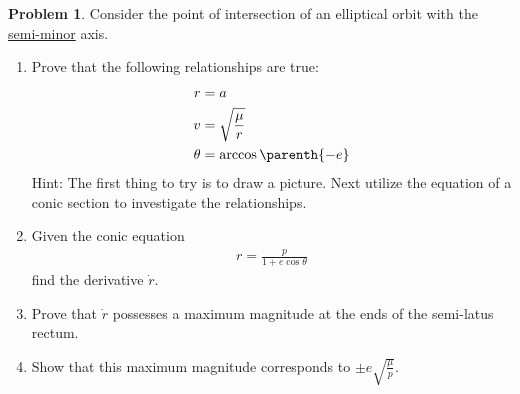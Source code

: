 \documentclass[10pt]{article}
\theoremstyle{definition}
\newtheorem{prob}{Problem}[section]
\newenvironment{subprob}%
{\renewcommand{\theenumi}{\alph{enumi}}\renewcommand{\labelenumi}{(\theenumi)}\begin{enumerate}}%
{\end{enumerate}}%
\begin{document}
\begin{prob}
    Consider the point of intersection of an elliptical orbit with the \underline{semi-minor} axis.
    \begin{subprob}
    \item Prove that the following relationships are true:
        \begin{align*}
            r &= a \\
            v &= \sqrt{\frac{\mu}{r}} \\
            \theta &= \arccos \parenth{-e} 
        \end{align*}
        Hint: The first thing to try is to draw a picture. 
        Next utilize the equation of a conic section to investigate the relationships.
    \item Given the conic equation
        \begin{align*}
            r = \frac{p}{1 + e \cos \theta}
        \end{align*}
        find the derivative \(  \dot{r} \).
    \item Prove that \( \dot{r} \) possesses a maximum magnitude at the ends of the semi-latus rectum. 
    \item Show that this maximum magnitude corresponds to \( \pm e \sqrt{\frac{\mu}{p}} \).
    \end{subprob}
\end{prob}
\end{document}
